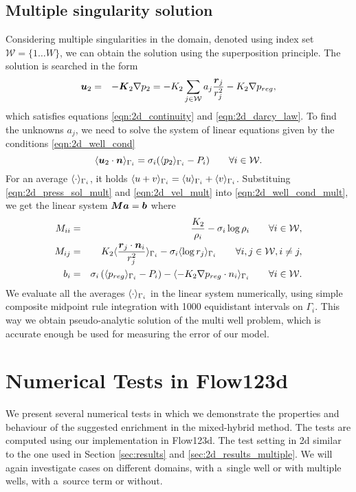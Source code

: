   \subsection{Multiple singularity solution}
  Considering multiple singularities in the domain, denoted using index set $\mathcal{W}=\{1\ldots W\}$, we can obtain the solution using the superposition principle.
  The solution is searched in the form
  \begin{eqnarray}
    \mathbf{\boldsymbol{u}}_2 &=& -\mathbf{\boldsymbol{K}}_2\nabla p_2 = -K_2 \sum\limits_{j\in\mathcal{W}} a_j\frac{\mathbf{\boldsymbol{r}}_j}{r_j^2} - K_2 \nabla p_{reg}, \label{eqn:2d_vel_mult}
  \end{eqnarray}
  which satisfies equations \eqref{eqn:2d_continuity} and \eqref{eqn:2d_darcy_law}.
  To find the unknowns $a_j$, we need to solve the system of linear equations given by the conditions \eqref{eqn:2d_well_cond}
  \begin{equation}
    \langle\mathbf{\boldsymbol{u}}_2 \cdot \mathbf{\boldsymbol{n}}\rangle_{\Gamma_i} = \sigma_i (\langle p_2\rangle_{\Gamma_i} - P_i) \qquad  \forall i\in\mathcal{W}. \label{eqn:2d_well_cond_mult}
  \end{equation}
  For an average $\langle\cdot\rangle_{\Gamma_i}$, it holds $\langle u+v\rangle_{\Gamma_i} = \langle u\rangle_{\Gamma_i} + \langle v\rangle_{\Gamma_i}$.
  Substituing \eqref{eqn:2d_press_sol_mult} and \eqref{eqn:2d_vel_mult} into \eqref{eqn:2d_well_cond_mult}, we get
  the linear system $\mathbf{\boldsymbol{M}}\mathbf{\boldsymbol{a}} = \mathbf{\boldsymbol{b}}$ where
  \begin{eqnarray}
    M_{ii} &=& \frac{K_2}{\rho_i} - \sigma_i\log\rho_i \qquad \forall i\in\mathcal{W},\\
    M_{ij} &=& K_2\langle\frac{\mathbf{\boldsymbol{r}}_j \cdot \mathbf{\boldsymbol{n}}_i}{r_j^2}\rangle_{\Gamma_i} - \sigma_i\langle\log r_j\rangle_{\Gamma_i} \qquad \forall i,j\in\mathcal{W}, i\neq j,\\
    b_{i} &=& \sigma_i\left(\langle p_{reg}\rangle_{\Gamma_i} - P_i \right) - \langle- K_2 \nabla p_{reg}\cdot n_i\rangle_{\Gamma_i} \qquad \forall i\in\mathcal{W}.
  \end{eqnarray}
  We evaluate all the averages $\langle\cdot\rangle_{\Gamma_i}$ in the linear system numerically,
  using simple composite midpoint rule integration with 1000 equidistant intervals on $\Gamma_i$.
  This way we obtain pseudo-analytic solution of the multi well problem, which is accurate enough
  be used for measuring the error of our model.

  
  
\section{Numerical Tests in Flow123d}
We present several numerical tests in which we demonstrate the properties and behaviour of the suggested enrichment in the mixed-hybrid method.
The tests are computed using our implementation in Flow123d.
The test setting in 2d similar to the one used in Section \ref{sec:results} and \ref{sec:2d_results_multiple}.
We will again investigate cases on different domains, with a~single well or with multiple wells, with a~source term or without.

